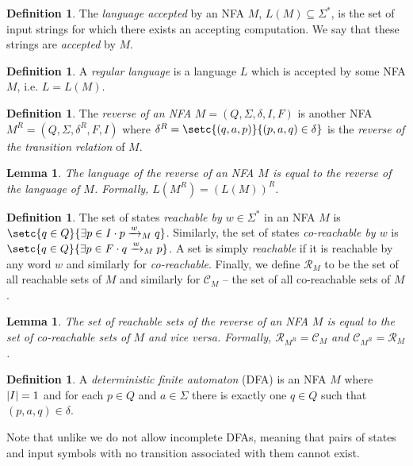 \documentclass{report}
\DeclarePairedDelimiter{\abs}{\lvert}{\rvert}
\newtheorem{lemma}[theorem]{Lemma}
\theoremstyle{definition}
\newtheorem{definition}[theorem]{Definition}
\begin{document}
\begin{definition} \label{def.NFA_language}
The \emph{language accepted} by an NFA $M$, $L(M) \subseteq \Sigma^{\ast}$,
is the set of input strings for which there exists an accepting computation.
We say that these strings are \emph{accepted} by $M$.
\end{definition}

\begin{definition} \label{def.regular_language}
A \emph{regular language} is a language $L$ which is accepted by some NFA $M$,
i.e. $L = L(M)$.
\end{definition}

\begin{definition} \label{def.reverse_NFA}
The \emph{reverse of an NFA} $M = (Q, \Sigma, \delta, I, F)$ is another
NFA $M^R = (Q, \Sigma, \delta^R, F, I)$ where
$\delta^R = \setc{(q, a, p)}{(p, a, q) \in \delta}$ is the \emph{reverse of the
transition relation} of $M$.
\end{definition}

\begin{lemma} \label{lma.of_reverse_is_reverse_of}
The language of the reverse of an NFA $M$ is equal to the reverse of the language
of $M$. Formally, $L(M^R) = (L(M))^R$.
\end{lemma}

\begin{definition} \label{def.reachable_sets}
The set of states \emph{reachable by $w \in \Sigma^{\ast}$} in an NFA $M$ is
$\setc{q \in Q}{\exists p \in I \cdot p \xrightarrow{w}_M q}$.
Similarly, the set of states \emph{co-reachable by $w$} is
$\setc{q \in Q}{\exists p \in F \cdot q \xrightarrow{w}_M p}$.
A set is simply \emph{reachable} if it is reachable by any word $w$ and similarly
for \emph{co-reachable}.
Finally, we define $\mathcal{R}_M$ to be the set of all reachable sets of $M$
and similarly for $\mathcal{C}_M$ -- the set of all co-reachable sets of $M$.
\end{definition}

\begin{lemma} \label{lma.reverse_reachable}
The set of reachable sets of the reverse of an NFA $M$ is equal to the set of
co-reachable sets of $M$ and vice versa. Formally,
$\mathcal{R}_{M^R} = \mathcal{C}_M$ and $\mathcal{C}_{M^R} = \mathcal{R}_M$.
\end{lemma}

\begin{definition} \label{def.DFA}
A \emph{deterministic finite automaton} (DFA) is an NFA $M$ where
$\abs{I} = 1$ and for each $p \in Q$ and $a \in \Sigma$ there is exactly
one $q \in Q$ such that $(p, a, q) \in \delta$.

Note that unlike \cite{UFA_UB} we do not allow incomplete DFAs, meaning that pairs
of states and input symbols with no transition associated with them cannot exist.
\end{definition}
\end{document}
